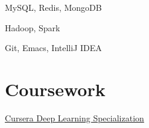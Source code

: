 \documentclass[]{hieudo-build}
\begin{document}
\begin{minipage}[t]{0.34\textwidth}
MySQL, Redis, MongoDB \\

\vspace{0.9em} %

Hadoop, Spark \\

\vspace{0.9em} %

Git, Emacs, IntelliJ IDEA \\
 

\sectionsep{}



\section{Coursework}
\href{https://www.coursera.org/account/accomplishments/specialization/B9VD5GVFH3J5}{Cursera Deep Learning Specialization }\\
\sectionsep{}




\end{minipage}
\end{document}
